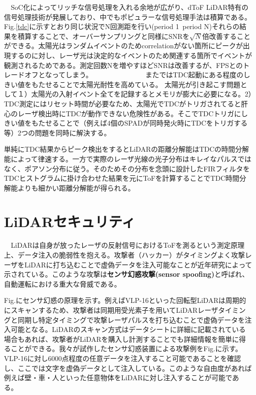 \documentclass[twocolumn, 11pt, a4j]{article}
\begin{document}
　SoC化によってリッチな信号処理を入れる余地が広がり、dToF LiDAR特有の信号処理技術が発展しており、中でもポピュラーな信号処理手法は積算である。Fig.\ref{tdc}に示すとおり同じ状況でN回測距を行い(period 1~period N)それらの結果を積算することで、オーバーサンプリングと同様にSNRを$\sqrt{N}$倍改善することができる。太陽光はランダムイベントのためcorrelationがない箇所にピークが出現するのに対し、レーザ光は決定的なイベントのため関連する箇所でイベントが観測されるためである。測定回数Nを増やすほどSNRは改善するが、FPSとのトレードオフとなってしまう。
　　　　　　　
また\cite{niclass2012100}ではTDC起動にある程度のしきい値をもたせることで太陽光耐性を高めている。
太陽光が引き起こす問題として１）太陽光の入射イベント全てを記録するとメモリが膨大に必要になる。2）TDC測定にはリセット時間が必要なため、太陽光でTDCがトリガされてると肝心のレーザ検出時にTDCが動作できない危険性がある。そこでTDCトリガにしきい値をもたせることで（例えば4個のSPADが同時発火時にTDCをトリガする等）2つの問題を同時に解決する。

単純にTDC結果からピーク検出をするとLiDARの距離分解能はTDCの時間分解能によって律速する。一方で実際のレーザ光線の光子分布はキレイなパルスではなく、ポアソン分布に従う。そのためその分布を念頭に設計したFIRフィルタをTDCヒストグラムに掛け合わせた結果を元にToFを計算することでTDC時間分解能よりも細かい距離分解能が得られる。

\section{LiDARセキュリティ}
　LiDARは自身が放ったレーザの反射信号におけるToFを測るという測定原理上、データ注入の脆弱性を抱える。攻撃者（ハッカー）がタイミングよく攻撃レーザをLiDARに打ち込むことで虚偽データを注入可能なことが近年研究によって示されている\cite{sato2022poster,cao2019adversarial,hallyburton2022security,illusion, cao2022you}。このような攻撃は\textbf{センサ幻惑攻撃(sensor spoofing)}と呼ばれ、自動運転における重大な脅威である。
 
Fig.にセンサ幻惑の原理を示す。例えばVLP-16といった回転型LiDARは周期的にスキャンするため、攻撃者は同期用受光素子を用いてLiDARレーザタイミングと同期し特定タイミングで攻撃レーザパルスを打ち込むことで虚偽データを注入可能となる。LiDARのスキャン方式はデータシートに詳細に記載されている場合もあれば、攻撃者がLiDARを購入し計測することでも詳細情報を簡単に得ることができる。我々が試作したセンサ幻惑装置による攻撃例をFig.に示す。VLP-16に対し6000点程度の任意データを注入すること可能であることを確認し、ここでは文字を虚偽データとして注入している。このような自由度があれば例えば壁・車・人といった任意物体をLiDARに対し注入することが可能である。
\end{document}
